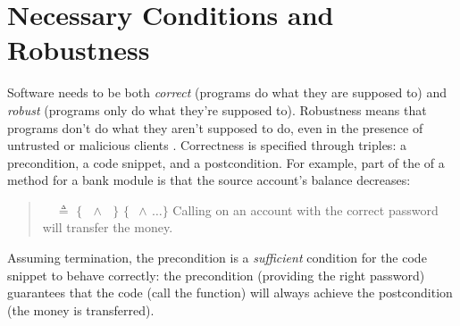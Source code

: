 \section{Necessary Conditions and Robustness}
\label{s:intro}




{Software needs} to be both {\emph{correct}} ({programs do what they
  are supposed to}) and {\emph{robust}} ({programs only do what
  they're supposed to}). Robustness means that
programs don't do what they aren't supposed to do, even in the
presence of untrusted or malicious {clients} \cite{ieeeStandard}.
{Correctness is}  specified
through  triples: a  precondition, a code snippet, and a
 postcondition. 
 For example,  {part of the \funcSpec
   of a  method for a bank module is that the source account's balance decreases:}
 \begin{quote}
   \Scorrect\ \ $\triangleq$  
 {\footnotesize{ $\{\,$ $\,\wedge\,$ $\,\}$  $\{$ $\,\wedge\,\dots \}$ }} Calling  on  {an account with the correct password} will transfer the money.
\end{quote}
Assuming termination, the precondition is a \emph{sufficient} condition for the {code snippet to behave correctly}: 
the precondition (\eg providing the right 
password) guarantees that
the code (\eg call the  function)
will always achieve the postcondition (the money is transferred).
 
